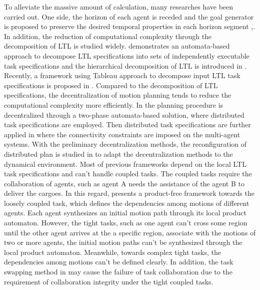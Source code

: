 \documentclass[journal]{IEEEtran}
\begin{document}

To alleviate the massive amount of calculation, many researches have been carried out. One side, the horizon of each agent is receded and the goal generator is proposed to preserve the desired temporal properties in each horizon segment \cite{wongpiromsarn2012receding},\cite{tumova2014receding}. In addition, the reduction of computational complexity through the decomposition of LTL is studied widely. \cite{schillinger2018decomposition} demonstrates an automata-based approach to decompose LTL specifications into sets of independently executable task specifications and the hierarchical decomposition of LTL is introduced in \cite{meyer2017hierarchical}. Recently, a framework using Tableau approach to decompose input LTL task specifications is proposed in \cite{al2018efficient}. Compared to the decomposition of LTL specifications, the decentralization of motion planning tends to reduce the computational complexity more efficiently. In \cite{tumova2015decomposition} the planning procedure is decentralized through a two-phase automata-based solution, where distributed task specifications are employed. Then distributed task specifications are further applied in \cite{guo2014cooperative} where the connectivity constraints are imposed on the multi-agent systems. With the preliminary decentralization methods, the reconfiguration of distributed plan is studied in \cite{guo2014distributed} to adapt the decentralization methods to the dynamical environment. Most of previous frameworks depend on the local LTL task specifications and can't handle coupled tasks. The coupled tasks require the collaboration of agents, such as agent A needs the assistance of the agent B to deliver the cargoes. In this regard, \cite{guo2017task} presents a product-free framework towards the loosely coupled task, which defines the dependencies among motions of different agents. Each agent synthesizes an initial motion path through its local product automaton. However, the tight tasks, such as one agent can't cross some region until the other agent arrives at the a specific region, associate with the motions of two or more agents, the initial motion paths can't be synthesized through the local product automaton. Meanwhile, towards complex tight tasks, the dependencies among motions can't be defined clearly. In addition, the task swapping method in \cite{guo2017task} may cause the failure of task collaboration due to the requirement of collaboration integrity under the tight coupled tasks.
\end{document}
